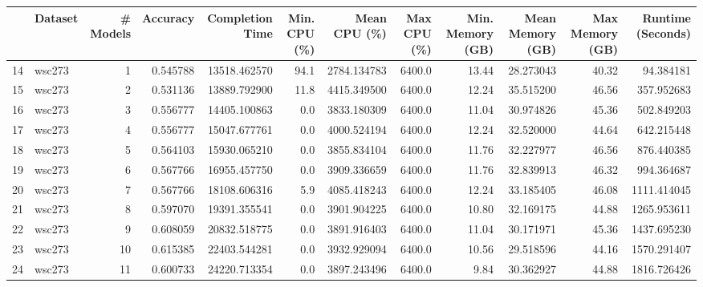 \begin{tabular}{llrrrrrrrrrr}
\toprule
{} & Dataset &  \# Models &  Accuracy &  Completion Time &  Min. CPU (\%) &  Mean CPU (\%) &  Max CPU (\%) &  Min. Memory (GB) &  Mean Memory (GB) &  Max Memory (GB) &  Runtime (Seconds) \\
\midrule
14 &  wsc273 &         1 &  0.545788 &     13518.462570 &          94.1 &   2784.134783 &       6400.0 &             13.44 &         28.273043 &            40.32 &          94.384181 \\
15 &  wsc273 &         2 &  0.531136 &     13889.792900 &          11.8 &   4415.349500 &       6400.0 &             12.24 &         35.515200 &            46.56 &         357.952683 \\
16 &  wsc273 &         3 &  0.556777 &     14405.100863 &           0.0 &   3833.180309 &       6400.0 &             11.04 &         30.974826 &            45.36 &         502.849203 \\
17 &  wsc273 &         4 &  0.556777 &     15047.677761 &           0.0 &   4000.524194 &       6400.0 &             12.24 &         32.520000 &            44.64 &         642.215448 \\
18 &  wsc273 &         5 &  0.564103 &     15930.065210 &           0.0 &   3855.834104 &       6400.0 &             11.76 &         32.227977 &            46.56 &         876.440385 \\
19 &  wsc273 &         6 &  0.567766 &     16955.457750 &           0.0 &   3909.336659 &       6400.0 &             11.76 &         32.839913 &            46.32 &         994.364687 \\
20 &  wsc273 &         7 &  0.567766 &     18108.606316 &           5.9 &   4085.418243 &       6400.0 &             12.24 &         33.185405 &            46.08 &        1111.414045 \\
21 &  wsc273 &         8 &  0.597070 &     19391.355541 &           0.0 &   3901.904225 &       6400.0 &             10.80 &         32.169175 &            44.88 &        1265.953611 \\
22 &  wsc273 &         9 &  0.608059 &     20832.518775 &           0.0 &   3891.916403 &       6400.0 &             11.04 &         30.171971 &            45.36 &        1437.695230 \\
23 &  wsc273 &        10 &  0.615385 &     22403.544281 &           0.0 &   3932.929094 &       6400.0 &             10.56 &         29.518596 &            44.16 &        1570.291407 \\
24 &  wsc273 &        11 &  0.600733 &     24220.713354 &           0.0 &   3897.243496 &       6400.0 &              9.84 &         30.362927 &            44.88 &        1816.726426 \\

\end{tabular}
